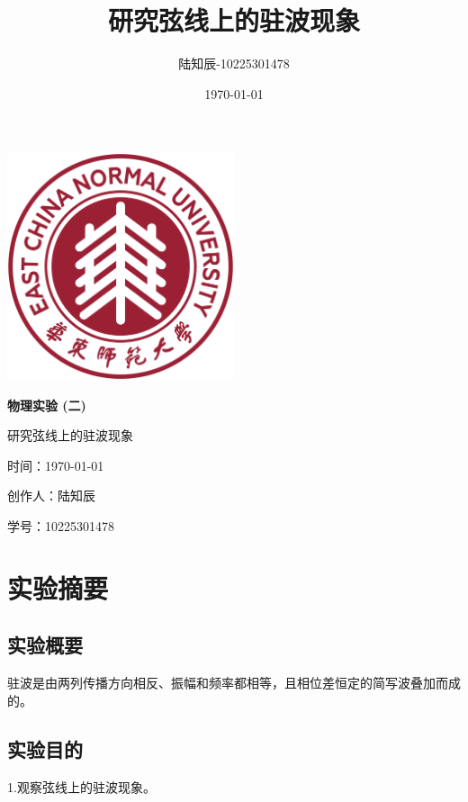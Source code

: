 \documentclass{ctexart}
\title{研究弦线上的驻波现象}
\author{陆知辰-10225301478}
\date{\today}
\begin{document}
\begin{titlepage}
  \centering
  \includegraphics[width=0.5\textwidth]{ecnu.png}
  
  \vspace*{\baselineskip}
  
  \Huge\textbf{物\quad 理\quad 实\quad 验 \quad (二)}
  \vspace*{0.3\baselineskip}
  
  \huge 研究弦线上的驻波现象
  
  \vspace*{2\baselineskip}
  
  \large 时间：\today
  
  \vspace*{\baselineskip}
  
  \large 创作人：陆知辰
  
  \vspace*{\baselineskip}
  
  \large 学号：10225301478
  
\end{titlepage}
\newpage
\tableofcontents
\newpage
\section{实验摘要}
  \subsection{实验概要}
  驻波是由两列传播方向相反、振幅和频率都相等，且相位差恒定的简写波叠加而成的。

  \subsection{实验目的}
  1.\quad 观察弦线上的驻波现象。
\end{document}
